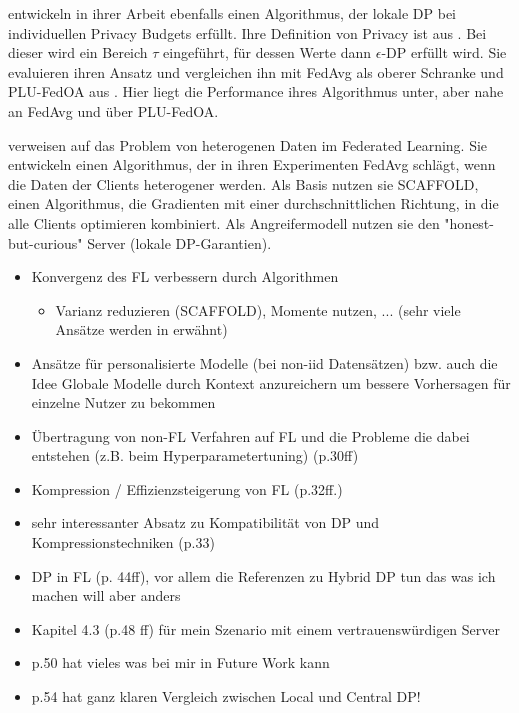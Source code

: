 \textcite{shen:2023} entwickeln in ihrer Arbeit ebenfalls einen Algorithmus, der lokale DP bei individuellen Privacy Budgets erfüllt. Ihre Definition von Privacy ist aus \textcite{chen:2016}. Bei dieser wird ein Bereich $\tau$ eingeführt, für dessen Werte dann $\epsilon$-DP erfüllt wird. Sie evaluieren ihren Ansatz und vergleichen ihn mit FedAvg \parencite{mcmahan:2016} als oberer Schranke und PLU-FedOA aus \textcite{yang:2021}. Hier liegt die Performance ihres Algorithmus unter, aber nahe an FedAvg und über PLU-FedOA.

\textcite{noble:2023} verweisen auf das Problem von heterogenen Daten im Federated Learning. Sie entwickeln einen Algorithmus, der in ihren Experimenten FedAvg schlägt, wenn die Daten der Clients heterogener werden. Als Basis nutzen sie SCAFFOLD, einen Algorithmus, die Gradienten mit einer durchschnittlichen Richtung, in die alle Clients optimieren kombiniert. Als Angreifermodell nutzen sie den "honest-but-curious" Server (lokale DP-Garantien). 

\begin{itemize}
	\item Konvergenz des FL verbessern durch Algorithmen
	\begin{itemize}
		\item Varianz reduzieren (SCAFFOLD), Momente nutzen, ... (sehr viele Ansätze werden in \textcite[p.26ff]{kairouz:2021} erwähnt)
	\end{itemize}
	\item Ansätze für personalisierte Modelle (bei non-iid Datensätzen) \parencite[p.28ff]{kairouz:2021} bzw. auch die Idee Globale Modelle durch Kontext anzureichern um bessere Vorhersagen für einzelne Nutzer zu bekommen
	\item Übertragung von non-FL Verfahren auf FL und die Probleme die dabei entstehen (z.B. beim Hyperparametertuning) (p.30ff)
	\item Kompression / Effizienzsteigerung von FL (p.32ff.)
	\item sehr interessanter Absatz zu Kompatibilität von DP und Kompressionstechniken (p.33)
	\item DP in FL (p. 44ff), vor allem die Referenzen zu Hybrid DP tun das was ich machen will aber anders
	\item Kapitel 4.3 (p.48 ff) für mein Szenario mit einem vertrauenswürdigen Server
	\item p.50 hat vieles was bei mir in Future Work kann
	\item p.54 hat ganz klaren Vergleich zwischen Local und Central DP!
\end{itemize}